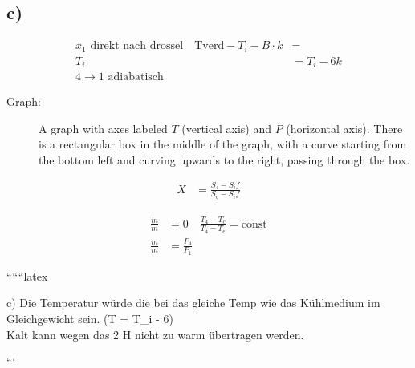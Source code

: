 

\subsection*{c)}

\begin{align*}
x_1 \text{ direkt nach drossel} \quad \text{Tverd} - T_i - B \cdot k &= \\
T_i &= T_i - 6k \\
4 \rightarrow 1 \text{ adiabatisch}
\end{align*}

\begin{description}
    \item[Graph:] A graph with axes labeled $T$ (vertical axis) and $P$ (horizontal axis). There is a rectangular box in the middle of the graph, with a curve starting from the bottom left and curving upwards to the right, passing through the box.
\end{description}

\begin{align*}
X &= \frac{S_4 - S_if}{S_g - S_if}
\end{align*}

\begin{align*}
\frac{\dot{m}}{\dot{m}} &= 0 \quad \frac{T_4 - T_c}{T_4 - T_e} = \text{const} \\
\frac{\dot{m}}{\dot{m}} &= \frac{P_4}{P_1}
\end{align*}

``````latex

c) Die Temperatur würde die  bei das gleiche Temp wie das Kühlmedium im Gleichgewicht sein. \quad (T = T_{i} - 6) \\
Kalt kann wegen das 2 H nicht  zu warm übertragen werden.

```